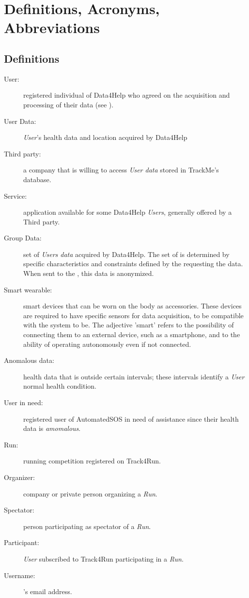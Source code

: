 \documentclass[../../rasd.tex]{subfiles}
\begin{document}
\section{Definitions, Acronyms, Abbreviations}
		\subsection{Definitions}
		\begin{description}
			\item[User:]registered individual of Data4Help who agreed on the acquisition and processing of their data (see ).
			\item[User Data:]\textit{User}'s health data and location acquired by Data4Help
			\item[Third party:]a company that is willing to access \textit{User data} stored in TrackMe's database.
			\item[Service:]application available for some Data4Help \textit{Users}, generally offered by a Third party.
			\item[Group Data:]set of \textit{Users data} acquired by Data4Help. The set of  is determined by specific characteristics and constraints defined by the  requesting the data. When sent to the , this data is anonymized.
			\item[Smart wearable:]smart devices that can be worn on the body as accessories. These devices are required to have specific sensors for data acquisition, to be compatible with the system to be. The adjective 'smart' refers to the possibility of connecting them to an external device, such as a smartphone, and to the ability of operating autonomously even if not connected.
			\item[Anomalous data:]health data that is outside certain intervals; these intervals identify a \textit{User} normal health condition.
			\item[User in need:]registered user of AutomatedSOS in need of assistance since their health data is \textit{amomalous}.
			\item[Run:]running competition registered on Track4Run. 
			\item[Organizer:]company or private person organizing a \textit{Run}.
			\item[Spectator:]person participating as spectator of a \textit{Run}.
			\item[Participant:]\textit{User} subscribed to Track4Run participating in a \textit{Run}.
			\item[Username:]'s email address.
			
			


		\end{description}
\end{document}
